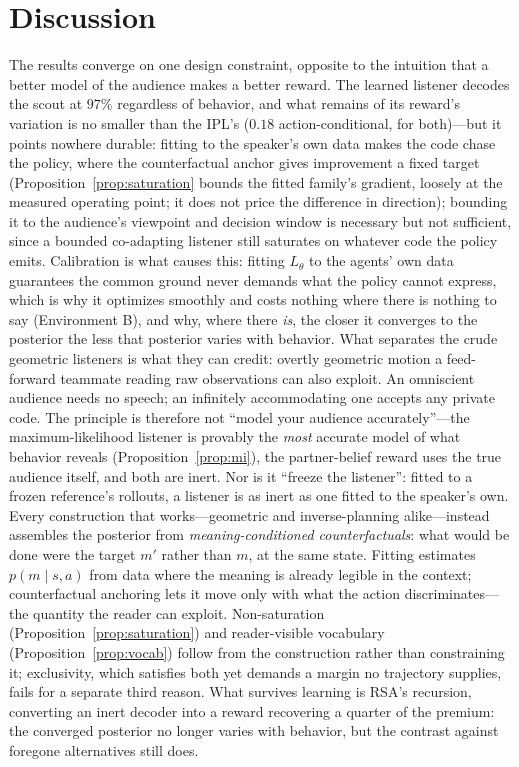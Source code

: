 \documentclass[sigconf,review,anonymous]{acmart}
\newcommand{\Ltheta}{L_\theta}
\begin{document}
\section{Discussion}
\label{sec:discussion}

The results converge on one design constraint, opposite to the intuition that a better model of the audience makes a better reward. The learned listener decodes the scout at $97\%$ regardless of behavior, and what remains of its reward's variation is no smaller than the IPL's ($0.18$ action-conditional, for both)---but it points nowhere durable: fitting to the speaker's own data makes the code chase the policy, where the counterfactual anchor gives improvement a fixed target (Proposition~\ref{prop:saturation} bounds the fitted family's gradient, loosely at the measured operating point; it does not price the difference in direction); bounding it to the audience's viewpoint and decision window is necessary but not sufficient, since a bounded co-adapting listener still saturates on whatever code the policy emits. Calibration is what causes this: fitting $\Ltheta$ to the agents' own data guarantees the common ground never demands what the policy cannot express, which is why it optimizes smoothly and costs nothing where there is nothing to say (Environment B), and why, where there \emph{is}, the closer it converges to the posterior the less that posterior varies with behavior. What separates the crude geometric listeners is what they can credit: overtly geometric motion a feed-forward teammate reading raw observations can also exploit. An omniscient audience needs no speech; an infinitely accommodating one accepts any private code. The principle is therefore not ``model your audience accurately''---the maximum-likelihood listener is provably the \emph{most} accurate model of what behavior reveals (Proposition~\ref{prop:mi}), the partner-belief reward uses the true audience itself, and both are inert. Nor is it ``freeze the listener'': fitted to a frozen reference's rollouts, a listener is as inert as one fitted to the speaker's own. Every construction that works---geometric and inverse-planning alike---instead assembles the posterior from \emph{meaning-conditioned counterfactuals}: what would be done were the target $m'$ rather than $m$, at the same state. Fitting estimates $p(m\mid s,a)$ from data where the meaning is already legible in the context; counterfactual anchoring lets it move only with what the action discriminates---the quantity the reader can exploit. Non-saturation (Proposition~\ref{prop:saturation}) and reader-visible vocabulary (Proposition~\ref{prop:vocab}) follow from the construction rather than constraining it; exclusivity, which satisfies both yet demands a margin no trajectory supplies, fails for a separate third reason. What survives learning is RSA's recursion, converting an inert decoder into a reward recovering a quarter of the premium: the converged posterior no longer varies with behavior, but the contrast against foregone alternatives still does.
\end{document}
